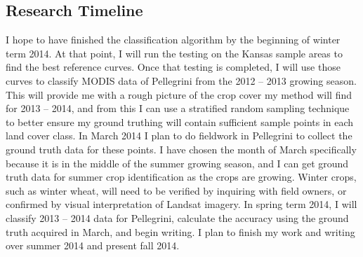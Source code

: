 \subsection*{Research Timeline}

I hope to have finished the classification algorithm by the beginning of winter term 2014.  At that point, I will run the testing on the Kansas sample areas to find the best reference curves. Once that testing is completed, I will use those curves to classify MODIS data of Pellegrini from the 2012 -- 2013 growing season. This will provide me with a rough picture of the crop cover my method will find for 2013 -- 2014, and from this I can use a stratified random sampling technique to better ensure my ground truthing will contain sufficient sample points in each land cover class. In March 2014 I plan to do fieldwork in Pellegrini to collect the ground truth data for these points. I have chosen the month of March specifically because it is in the middle of the summer growing season, and I can get ground truth data for summer crop identification as the crops are growing. Winter crops, such as winter wheat, will need to be verified by inquiring with field owners, or confirmed by visual interpretation of Landsat imagery. In spring term 2014, I will classify 2013 -- 2014 data for Pellegrini, calculate the accuracy using the ground truth acquired in March, and begin writing. I plan to finish my work and writing over summer 2014 and present fall 2014.
